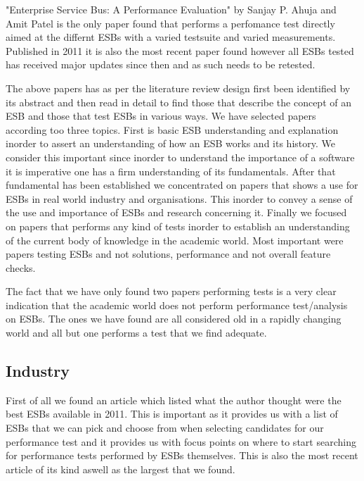 \documentclass{llncs}
\begin{document}
"Enterprise Service Bus: A Performance Evaluation" \cite{Sanjay2011} by Sanjay P. Ahuja and Amit Patel  is the only paper found that performs a perfomance test directly aimed at the differnt ESBs with a varied testsuite and varied measurements. Published in 2011 it is also the most recent paper found however all ESBs tested has received major updates since then and as such needs to be retested.

The above papers has as per the literature review design first been identified by its abstract and then read in detail to find those that describe the concept of an ESB and those that test ESBs in various ways. We have selected papers according too three topics. First is basic ESB understanding and explanation inorder to assert an understanding of how an ESB works and its history. We consider this important since inorder to understand the importance of a software it is imperative one has a firm understanding of its fundamentals. After that fundamental has been established we concentrated on papers that shows a use for ESBs in real world industry and organisations. This inorder to convey a sense of the use and importance of ESBs and research concerning it.
Finally we focused on papers that performs any kind of tests inorder to establish an understanding of the current body of knowledge in the academic world. Most important were papers testing ESBs and not solutions, performance and not overall feature checks.


The fact that we have only found two papers performing tests is a very clear indication that the academic world does not perform performance test/analysis on ESBs. The ones we have found are all considered old in a rapidly changing world and all but one performs a test that we find adequate.


\subsection{Industry}

First of all we found an article\cite{metha11} which listed what the author thought were the best ESBs available in 2011. This is important as it provides us with a list of ESBs that we can pick and choose from when selecting candidates for our performance test and it provides us with focus points on where to start searching for performance tests performed by ESBs themselves. This is also the most recent article of its kind aswell as the largest that we found.
\end{document}
